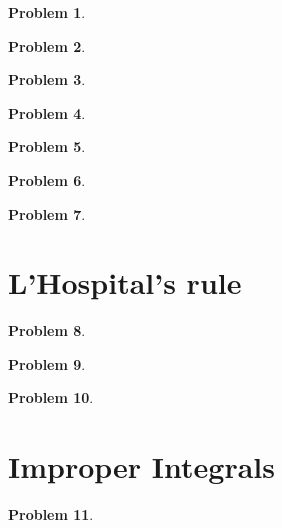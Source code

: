 \documentclass{article}
\newtheorem{problem}{Problem}
\begin{document}
\begin{problem}

\end{problem}


\begin{problem}

\end{problem}

\begin{problem}

\end{problem}
\begin{problem}

\end{problem}
\begin{problem}

\end{problem}
\begin{problem}

\end{problem}
\begin{problem}

\end{problem}
\section{L'Hospital's rule}

\begin{problem}

\end{problem}

\begin{problem}

\end{problem}


\begin{problem}

\end{problem}
\section{Improper Integrals}
\begin{problem}

\end{problem}

\end{document}
